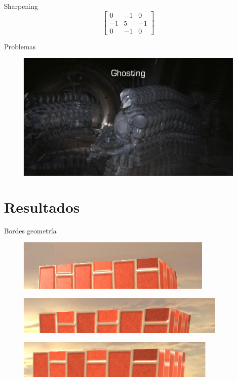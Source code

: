 \documentclass[table]{beamer}
\begin{document}
\begin{frame}[fragile]{Sharpening}
    \[
        \begin{bmatrix}
            0 & -1 & 0 \\
            -1 & 5 & -1 \\
            0 & -1 & 0
        \end{bmatrix}
    \]
\end{frame}

\begin{frame}[fragile]{Problemas}
    \begin{figure}
        \includegraphics[width=.8\linewidth]{./figures/ghosting.png}
    \end{figure}
\end{frame}

\section{Resultados}

\begin{frame}[fragile]{Bordes geometría}
    \begin{figure}
        \includegraphics[width=.9\linewidth]{./figures/taaoff.png}
    \end{figure}
    \begin{figure}
        \includegraphics[width=.9\linewidth]{./figures/taa8.png}
    \end{figure}
    \begin{figure}
        \includegraphics[width=.9\linewidth]{./figures/taa16.png}
    \end{figure}
\end{frame}
\end{document}
